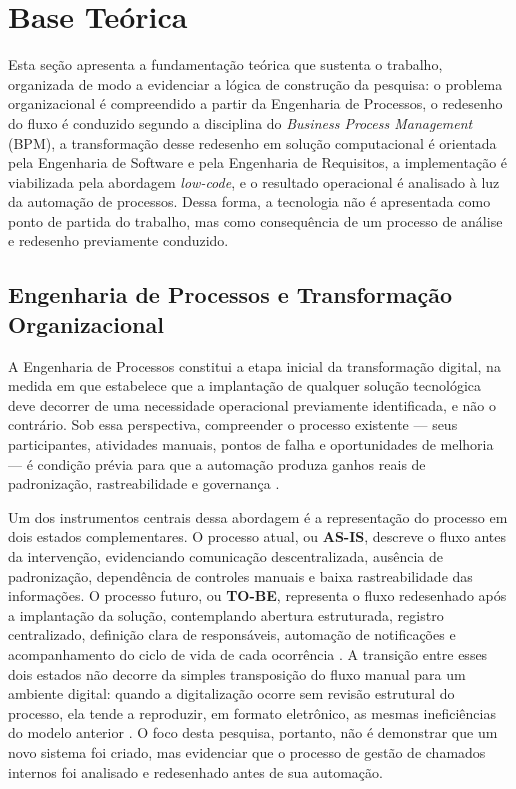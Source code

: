 \section{Base Teórica}

Esta seção apresenta a fundamentação teórica que sustenta o
trabalho, organizada de modo a evidenciar a lógica de
construção da pesquisa: o problema organizacional é
compreendido a partir da Engenharia de Processos, o
redesenho do fluxo é conduzido segundo a disciplina do
\textit{Business Process Management} (BPM), a transformação
desse redesenho em solução computacional é orientada pela
Engenharia de Software e pela Engenharia de Requisitos, a
implementação é viabilizada pela abordagem \textit{low-code},
e o resultado operacional é analisado à luz da automação de
processos. Dessa forma, a tecnologia não é apresentada como
ponto de partida do trabalho, mas como consequência de um
processo de análise e redesenho previamente conduzido.

\subsection{Engenharia de Processos e Transformação
Organizacional}

A Engenharia de Processos constitui a etapa inicial da
transformação digital, na medida em que estabelece que a
implantação de qualquer solução tecnológica deve decorrer de
uma necessidade operacional previamente identificada, e não
o contrário. Sob essa perspectiva, compreender o processo
existente --- seus participantes, atividades manuais, pontos
de falha e oportunidades de melhoria --- é condição prévia
para que a automação produza ganhos reais de padronização,
rastreabilidade e governança \cite{SantosCaldeiraPacheco2026}.

Um dos instrumentos centrais dessa abordagem é a
representação do processo em dois estados complementares.
O processo atual, ou \textbf{AS-IS}, descreve o fluxo antes
da intervenção, evidenciando comunicação descentralizada,
ausência de padronização, dependência de controles manuais e
baixa rastreabilidade das informações. O processo futuro, ou
\textbf{TO-BE}, representa o fluxo redesenhado após a
implantação da solução, contemplando abertura estruturada,
registro centralizado, definição clara de responsáveis,
automação de notificações e acompanhamento do ciclo de vida
de cada ocorrência \cite{SantosCaldeiraPacheco2026}. A
transição entre esses dois estados não decorre da simples
transposição do fluxo manual para um ambiente digital: quando
a digitalização ocorre sem revisão estrutural do processo, ela
tende a reproduzir, em formato eletrônico, as mesmas
ineficiências do modelo anterior
\cite{SantosCaldeiraPacheco2026}. O foco desta pesquisa,
portanto, não é demonstrar que um novo sistema foi criado,
mas evidenciar que o processo de gestão de chamados internos
foi analisado e redesenhado antes de sua automação.

